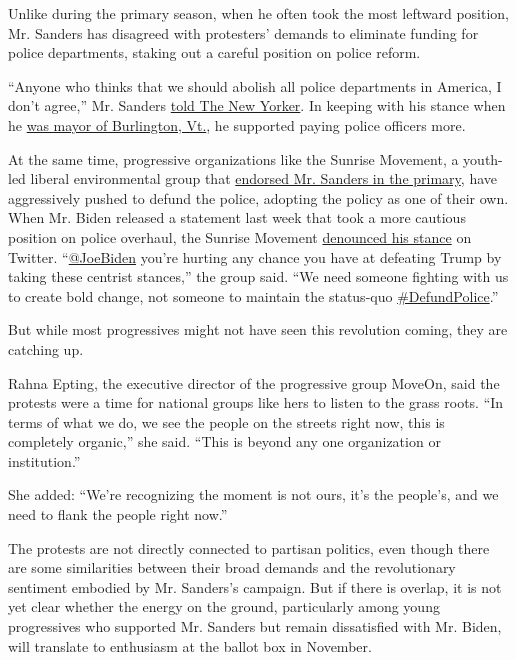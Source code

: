 Unlike during the primary season, when he often took the most leftward
position, Mr. Sanders has disagreed with protesters' demands to
eliminate funding for police departments, staking out a careful position
on police reform.

``Anyone who thinks that we should abolish all police departments in
America, I don't agree,'' Mr. Sanders
\href{https://www.newyorker.com/news/the-new-yorker-interview/bernie-sanders-is-not-done-fighting}{told
The New Yorker}. In keeping with his stance when he
\href{https://www.nytimes3xbfgragh.onion/2015/11/26/us/politics/as-mayor-bernie-sanders-was-more-pragmatic-than-socialist.html}{was
mayor of Burlington, Vt.}, he supported paying police officers more.

At the same time, progressive organizations like the Sunrise Movement, a
youth-led liberal environmental group that
\href{https://www.nytimes3xbfgragh.onion/2020/01/09/us/politics/bernie-sanders-sunrise-movement-endorsement.html}{endorsed
Mr. Sanders in the primary}, have aggressively pushed to defund the
police, adopting the policy as one of their own. When Mr. Biden released
a statement last week that took a more cautious position on police
overhaul, the Sunrise Movement
\href{https://twitter.com/sunrisemvmt/status/1270130352544235521}{denounced
his stance} on Twitter. ``\href{https://twitter.com/JoeBiden}{@JoeBiden}
you're hurting any chance you have at defeating Trump by taking these
centrist stances,'' the group said. ``We need someone fighting with us
to create bold change, not someone to maintain the status-quo
\href{https://twitter.com/hashtag/DefundPolice?src=hashtag_click}{\#DefundPolice}.''

But while most progressives might not have seen this revolution coming,
they are catching up.

Rahna Epting, the executive director of the progressive group MoveOn,
said the protests were a time for national groups like hers to listen to
the grass roots. ``In terms of what we do, we see the people on the
streets right now, this is completely organic,'' she said. ``This is
beyond any one organization or institution.''

She added: ``We're recognizing the moment is not ours, it's the
people's, and we need to flank the people right now.''

The protests are not directly connected to partisan politics, even
though there are some similarities between their broad demands and the
revolutionary sentiment embodied by Mr. Sanders's campaign. But if there
is overlap, it is not yet clear whether the energy on the ground,
particularly among young progressives who supported Mr. Sanders but
remain dissatisfied with Mr. Biden, will translate to enthusiasm at the
ballot box in November.

